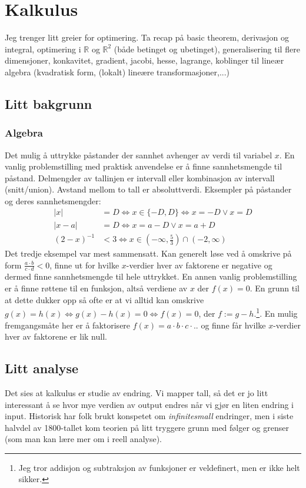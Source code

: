 \chapter{Kalkulus}
Jeg trenger litt greier for optimering. Ta recap på basic theorem, derivasjon og integral, optimering i $\mathbb{R}$ og $\mathbb{R}^2$ (både betinget og ubetinget), generalisering til flere dimensjoner, konkavitet, gradient, jacobi, hesse, lagrange, koblinger til lineær algebra (kvadratisk form, (lokalt) lineære transformasjoner,...)
\section{Litt bakgrunn}
\subsection{Algebra}
Det mulig å uttrykke påstander der sannhet avhenger av verdi til variabel $x$. En vanlig problemstilling med praktisk anvendelse er å finne sannhetsmengde til påstand. Delmengder av tallinjen er intervall eller kombinasjon av intervall (snitt/union). Avstand mellom to tall er absoluttverdi. Eksempler på påstander og deres sannhetsmengder:
\begin{align}
|x|&=D \iff x \in \{-D,D\} \iff x=-D \lor x=D \\
|x-a|&=D \iff x=a-D \lor x=a+D \\
(2-x)^{-1}&<3 \iff x \in (-\infty,\frac{5}{3}) \cap  (-2,\infty)
\end{align}
Det tredje eksempel var mest sammensatt. Kan generelt løse ved å omskrive på form $\frac{a\cdot b}{c \cdot d} <0$, finne ut for hvilke $x$-verdier hver av faktorene er negative og dermed finne sannhetsmengde til hele uttrykket. En annen vanlig problemstilling er å finne røttene til en funksjon, altså verdiene av $x$ der $f(x)=0$. En grunn til at dette dukker opp så ofte er at vi alltid kan omskrive $g(x)=h(x) \iff g(x)-h(x)=0 \iff f(x) = 0$, der $f:= g-h$.\footnote{Jeg tror addisjon og subtraksjon av funksjoner er veldefinert, men er ikke helt sikker.}. En mulig fremgangsmåte her er å faktorisere $f(x)=a\cdot b \cdot c \cdot ..$ og finne får hvilke $x$-verdier hver av faktorene er lik null.
\section{Litt analyse}
Det sies at kalkulus er studie av endring. Vi mapper tall, så det er jo litt interessant å se hvor mye verdien av output endres når vi gjør en liten endring i input. Historisk har folk brukt konspetet om \textit{infinitesmall} endringer, men i siste halvdel av 1800-tallet kom teorien på litt tryggere grunn med følger og grenser (som man kan lære mer om i reell analyse).
